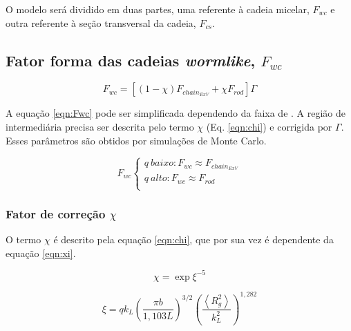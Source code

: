 \begin{apendicesenv}
	O modelo será dividido em duas partes, uma referente à cadeia micelar, $F_{wc}$ e outra referente à seção transversal da cadeia, $F_{cs}$.
	
	\subsection{Fator forma das cadeias \emph{wormlike}, $F_{wc}$}
	
	\begin{equation}
	F_{wc} = \left[\left(1 - \chi\right)F_{chain_{ExV}} + \chi F_{rod}\right]\Gamma
	\label{eqn:Fwc}
	\end{equation}
	
	A equação \ref{eqn:Fwc} pode ser simplificada dependendo da faixa de \q. A região de \q intermediária precisa ser descrita pelo termo $\chi$ (Eq. \ref{eqn:chi}) e corrigida por $\Gamma$. Esses parâmetros são obtidos por simulações de Monte Carlo.
	
	\begin{equation}
	F_{wc} \left\{
	\begin{matrix}
	q\ baixo: F_{wc} \approx F_{chain_{ExV}} \\
	q\ alto: F_{wc} \approx F_{rod} \\
	\end{matrix} \right.
	\end{equation}
	
	
	\subsubsection{Fator de correção $\chi$}
	O termo $\chi$ é descrito pela equação \ref{eqn:chi}, que por sua vez é dependente da equação \ref{eqn:xi}.
	
	\begin{equation}
	\chi = \exp{\xi^{-5}}
	\label{eqn:chi}
	\end{equation}
	
	\begin{equation}
	\xi = q k_L\left(\frac{\pi b}{1,103L}\right)^{3/2}\left(\frac{\left<R_g^2\right>}{k_L^2}\right)^{1,282}
	\label{eqn:xi}
	\end{equation}
	

\end{apendicesenv}
